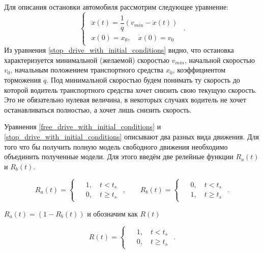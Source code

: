 \documentclass[12pt, a4paper]{extarticle}
\numberwithin{equation}{section}
\begin{document}
Для описания остановки автомобиля рассмотрим следующее уравнение: 
\begin{equation} \label{stop_drive_with_initial_conditions}
\begin{cases}
\begin{split}
\ddot{x}(t) = \dfrac{1}{q}\left( v_{min} - \dot{x}(t)\right) \\
x(0)=x_0, \quad \dot{x}(0)=v_0
\end{split}
\end{cases}.
\end{equation}
Из уравнения \eqref{stop_drive_with_initial_conditions} видно, что остановка характеризуется минимальной (желаемой) скоростью $v_{min}$, начальной скоростью $v_{0}$, начальным положением транспортного средства $x_0$, коэффициентом торможения $q$. Под минимальной скоростью будем понимать ту скорость до которой водитель транспортного средства хочет снизить свою текущую скорость. Это не обязательно нулевая величина, в некоторых случаях водитель не хочет останавливаться полностью, а хочет лишь снизить скорость.

Уравнения \eqref{free_drive_with_initial_conditions} и  \eqref{stop_drive_with_initial_conditions} описывают два разных вида движения. Для того что бы получить полную модель свободного движения необходимо объединить полученные модели. Для этого введём две релейные функции $R_{a}(t)$ и $R_{b}(t)$.  

\begin{equation*} 
R_{a}(t)=
\begin{cases}
\begin{split}
&1, \quad t<t_{s} \\
&0, \quad t\geq t_{s}
\end{split}
\end{cases},
\qquad
R_{b}(t)=
\begin{cases}
\begin{split}
&0, \quad t<t_{s} \\
&1, \quad t\geq t_{s}
\end{split}
\end{cases}.
\end{equation*}

$R_{a}(t) = (1-R_{b}(t))$ и обозначим как $R(t)$

\begin{equation*} 
R(t)=
\begin{cases}
\begin{split}
&1, \quad t<t_{s} \\
&0, \quad t\geq t_{s}
\end{split}
\end{cases}.
\end{equation*}
\end{document}
